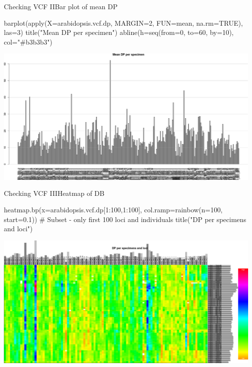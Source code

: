 \documentclass[compress, ucs, xelatex, 11pt, xcolor=svgnames,
  hyperref={
    bookmarks=true,
    unicode=true,
    colorlinks=true,
    pdftitle={Molecular data in R},
    plainpages=false,
    pdfauthor={Vojtech Zeisek},
    pdfsubject={Course about phylogeny and evolution in R},
    pdfcreator={XeLaTeX},
    pdfkeywords={R, evolution, phylogeny, molecular data},
    linkcolor=Tomato,
    anchorcolor=SaddleBrown,
    citecolor=Goldenrod,
    filecolor=DarkMagenta,
    menucolor=Sienna,
    urlcolor=DarkTurquoise,
    pdftex},
  url={hyphens, lowtilde} %
  ]{beamer}
\begin{document}
\begin{frame}[fragile]{Checking VCF II}{Bar plot of mean DP}
  \begin{spluscode}
    barplot(apply(X=arabidopsis.vcf.dp, MARGIN=2, FUN=mean, na.rm=TRUE),
      las=3)
    title("Mean DP per specimen")
    abline(h=seq(from=0, to=60, by=10), col="#b3b3b3")
  \end{spluscode}
  \begin{center}
    \includegraphics[width=\textwidth-2cm]{vcf_dp_mean.png}
  \end{center}
\end{frame}

\begin{frame}[fragile]{Checking VCF III}{Heatmap of DB}
  \begin{spluscode}
    heatmap.bp(x=arabidopsis.vcf.dp[1:100,1:100], col.ramp=rainbow(n=100,
      start=0.1)) # Subset - only first 100 loci and individuals
    title("DP per specimens and loci")
  \end{spluscode}
  \begin{center}
    \includegraphics[width=\textwidth-1.25cm]{vcf_dp_heatmap.png}
  \end{center}
\end{frame}
\end{document}
